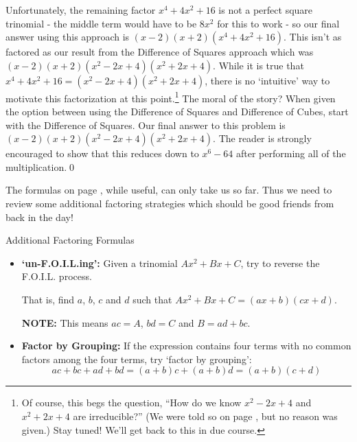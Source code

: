 \begin{ex}
\begin{enumerate}
Unfortunately, the remaining factor $x^4 + 4x^2 + 16$ is not a perfect square trinomial - the middle term would have to be $8x^2$ for this to work - so our final answer using this approach is $(x-2)(x+2)(x^4 + 4x^2 + 16)$.   This isn't as factored as our result from the Difference of Squares approach which was $(x-2)(x+2)(x^2-2x+4)(x^2+2x+4)$.  While it is true that $x^4 + 4x^2 + 16 = (x^2-2x+4)(x^2+2x+4)$, there is no `intuitive' way to motivate this factorization at this point.\footnote{Of course, this begs the question, ``How do we know $x^2-2x+4$ and $x^2+2x+4$ are irreducible?'' (We were told so on page \pageref{box:CommonFactoringFormulas}, but no reason was given.)  Stay tuned!  We'll get back to this in due course.}  The moral of the story?  When given the option between using the Difference of Squares and Difference of Cubes, start with the Difference of Squares.  Our final answer to this problem is  $(x-2)(x+2)(x^2-2x+4)(x^2+2x+4)$.  The reader is strongly encouraged to show that this reduces down to $x^6 - 64$ after performing all of the  multiplication.\qed

\end{enumerate}
\end{ex}

The formulas on page \pageref{box:CommonFactoringFormulas}, while useful, can only take us so far.  Thus we need to review some additional factoring strategies which should be good friends from back in the day!

\begin{floatbox}[label=box:AdvancedReviewFactoring]{Additional Factoring Formulas}

\begin{itemize}[leftmargin=*]

\item  \textbf{`un-F.O.I.L.ing':} Given a trinomial $Ax^2 + Bx + C$, try to reverse the F.O.I.L. process.  

That is, find  $a$, $b$, $c$ and $d$ such that $Ax^2 + Bx + C= (ax+b)(cx+d)$.  

\textbf{NOTE:}  This means $ac = A$, $bd = C$ and $B = ad+bc$.

\item \textbf{Factor by Grouping:} If the expression contains four terms with no common factors among the four terms, try `factor by grouping': \[ac + bc + ad + bd = (a +b)c + (a+b)d = (a+b)(c+d)\]

\end{itemize}

\end{floatbox}


